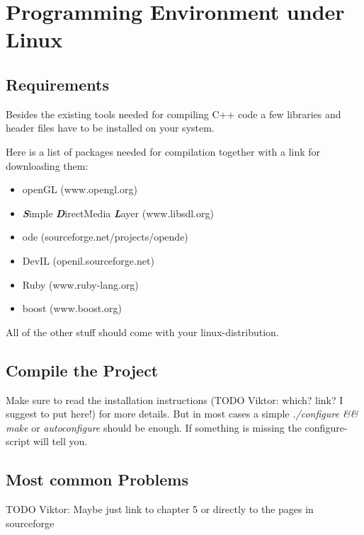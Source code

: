 
\chapter{Programming Environment under Linux}


\section{Requirements}

Besides the existing tools needed for compiling C++ code a few libraries and
header files have to be installed on your system.

Here is a list of packages needed for compilation together with a link for downloading them:

\begin{itemize}
\item openGL (www.opengl.org)
\item \textbf{\emph{S}}imple \textbf{\emph{D}}irectMedia \textbf{\emph{L}}ayer
(www.libsdl.org)
\item ode (sourceforge.net/projects/opende)
\item DevIL (openil.sourceforge.net)
\item Ruby (www.ruby-lang.org)
\item boost (www.boost.org)
\end{itemize}
All of the other stuff should come with your linux-distribution.


\section{Compile the Project}

Make sure to read the installation instructions (TODO Viktor: which? link? I suggest to put here!) 
for more details.
But in most cases a simple \emph{./configure \&\& make} or \emph{autoconfigure}
should be enough. If something is missing the configure-script will
tell you.


\section{Most common Problems}

TODO Viktor: Maybe just link to chapter 5 or directly to the pages in sourceforge
